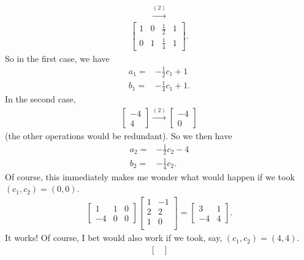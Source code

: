 \documentclass[12pt]{article}
\begin{document}
\begin{enumerate}
\begin{align*}
      \xrightarrow{(2)}
    \end{align*}
    \begin{align*}
      \begin{bmatrix}
        1 & 0 & \frac{1}{2} & 1\\
        0 & 1 & \frac{1}{4} & 1
      \end{bmatrix}.
    \end{align*}
    So in the first case, we have
    \begin{align*}
      a_1 =& -\frac{1}{2}c_1 + 1\\
      b_1 =& -\frac{1}{4}c_1 + 1.
    \end{align*}
    In the second case,
    \begin{align*}
      \begin{bmatrix}
        -4\\
        4
      \end{bmatrix}
      \xrightarrow{(2)}
      \begin{bmatrix}
        -4\\
        0
      \end{bmatrix}
    \end{align*}
    (the other operations would be redundant). So we then have
    \begin{align*}
      a_2 =& -\frac{1}{2}c_2 - 4\\
      b_2 =& -\frac{1}{4}c_2.
    \end{align*}
    Of course, this immediately makes me wonder what would happen
    if we took $(c_1,c_2) = (0,0)$.
    \begin{align*}
      \begin{bmatrix}
        1  & 1 & 0\\
        -4 & 0 & 0
      \end{bmatrix}
      \begin{bmatrix}
        1 & -1\\
        2 &  2\\
        1 &  0\\
      \end{bmatrix}
      =
      \begin{bmatrix}
        3  & 1\\
        -4 & 4
      \end{bmatrix}.
    \end{align*}
    It works! Of course, I bet would also work if we took, say,
    $(c_1,c_2) = (4,4)$.
    \begin{align*}
      \begin{bmatrix}

\end{bmatrix}
\end{align*}
\end{enumerate}
\end{document}
